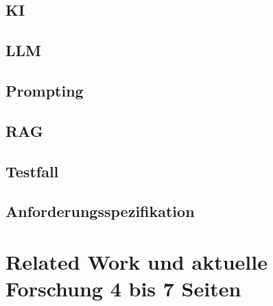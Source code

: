 \documentclass[12pt,toc=bib,toc=listof]{scrreprt}
\begin{document}
\section{KI} %
\label{sec:KI}

\section{LLM} %
\label{sec:llm}


\section{Prompting} %
\label{sec:prompting}


\section{RAG} %
\label{sec:rag}

\section{Testfall} %
\label{sec:testfall}

\section{Anforderungsspezifikation} %
\label{sec:Anforderungsspezifikation}



\chapter{Related Work und aktuelle Forschung 4 bis 7 Seiten} %
\label{sec:related_work_und_aktuelle_forschung}
\end{document}
